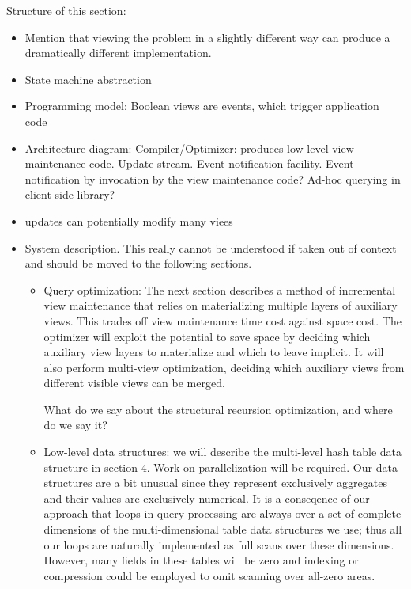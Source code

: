 Structure of this section:
\begin{itemize}
\item
Mention that viewing the problem in a slightly different way can produce a dramatically different implementation.

\item
State machine abstraction

\item
Programming model: Boolean views are events, which trigger application code

\item
Architecture diagram:
Compiler/Optimizer: produces low-level view maintenance code.
Update stream.
Event notification facility.
Event notification by invocation by the view maintenance code?
Ad-hoc querying in client-side library?

\item updates can potentially modify many viees

\item
System description.
This really cannot be understood if taken out of context and should be moved to the following sections.
\begin{itemize}
\item
Query optimization: The next section describes a method of incremental view maintenance that relies on materializing multiple layers of auxiliary views. This trades off view maintenance time cost against space cost. The optimizer will exploit the potential to save space by  deciding which auxiliary view layers to materialize and which to leave implicit. It will also perform
multi-view optimization, deciding which auxiliary views from different visible views can be merged.

What do we say about the structural recursion optimization, and where do we say it?

\item
Low-level data structures: we will describe the multi-level hash table data structure in section 4. Work on parallelization will be required. Our data structures are a bit unusual since they represent exclusively aggregates and their values are exclusively numerical. It is a conseqence of our approach that loops in query processing are always over a set of complete dimensions of the multi-dimensional table data structures we use; thus all our loops are naturally implemented as full scans over these dimensions. However, many fields in these tables will be zero and indexing or compression could be employed to omit scanning over all-zero areas.
\end{itemize}
\end{itemize}


